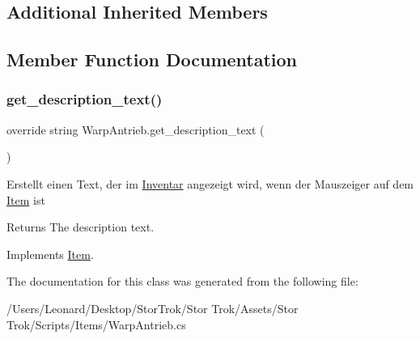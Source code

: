 \subsection*{Additional Inherited Members}


\subsection{Member Function Documentation}
\mbox{\label{class_warp_antrieb_a6fab9b91e972d0411541b2a2ff89a21e}} 
\subsubsection{\texorpdfstring{get\+\_\+description\+\_\+text()}{get\_description\_text()}}
{\footnotesize\ttfamily override string Warp\+Antrieb.\+get\+\_\+description\+\_\+text (\begin{DoxyParamCaption}{ }\end{DoxyParamCaption})\hspace{0.3cm}{\ttfamily [virtual]}}



Erstellt einen Text, der im \hyperlink{class_inventar}{Inventar} angezeigt wird, wenn der Mauszeiger auf dem \hyperlink{class_item}{Item} ist 

\begin{DoxyReturn}{Returns}
The description text.
\end{DoxyReturn}


Implements \hyperlink{class_item_ab868f8ccad92378f7352e3a9e0f755ff}{Item}.



The documentation for this class was generated from the following file\+:\begin{DoxyCompactItemize}
\item 
/\+Users/\+Leonard/\+Desktop/\+Stor\+Trok/\+Stor Trok/\+Assets/\+Stor Trok/\+Scripts/\+Items/Warp\+Antrieb.\+cs\end{DoxyCompactItemize}
